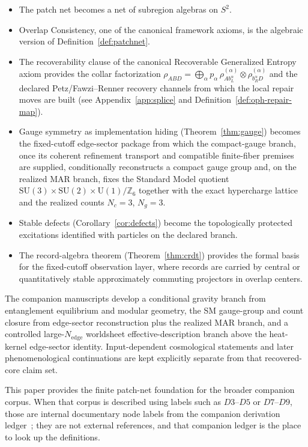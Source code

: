 \documentclass[11pt]{article}
\theoremstyle{remark}
\theoremstyle{plain}
\begin{document}
\begin{itemize}
\item The patch net becomes a net of subregion algebras on $S^2$.
\item Overlap Consistency, one of the canonical framework axioms, is the algebraic version of Definition~\ref{def:patchnet}.
\item The recoverability clause of the canonical Recoverable Generalized Entropy axiom provides the collar factorization $\rho_{ABD} = \bigoplus_\alpha p_\alpha\,\rho^{(\alpha)}_{Ab_L^\alpha}\otimes\rho^{(\alpha)}_{b_R^\alpha D}$ and the declared Petz/Fawzi--Renner recovery channels from which the local repair moves are built (see Appendix~\ref{app:splice} and Definition~\ref{def:oph-repair-map}).
\item Gauge symmetry as implementation hiding (Theorem~\ref{thm:gauge}) becomes the fixed-cutoff edge-sector package from which the compact-gauge branch, once its coherent refinement transport and compatible finite-fiber premises are supplied, conditionally reconstructs a compact gauge group and, on the realized MAR branch, fixes the Standard Model quotient $\mathrm{SU}(3)\times\mathrm{SU}(2)\times\mathrm{U}(1)/\mathbb{Z}_6$ together with the exact hypercharge lattice and the realized counts \(N_c=3\), \(N_g=3\).
\item Stable defects (Corollary~\ref{cor:defects}) become the topologically protected excitations identified with particles on the declared branch.
\item The record-algebra theorem (Theorem~\ref{thm:crdt}) provides the formal basis for the fixed-cutoff observation layer, where records are carried by central or quantitatively stable approximately commuting projectors in overlap centers.
\end{itemize}

The companion manuscripts develop a conditional gravity branch from entanglement equilibrium and modular geometry, the SM gauge-group and count closure from edge-sector reconstruction plus the realized MAR branch, and a controlled large-\(N_{\mathrm{edge}}\) worldsheet effective-description branch above the heat-kernel edge-sector identity. Input-dependent cosmological statements and later phenomenological continuations are kept explicitly separate from that recovered-core claim set.

This paper provides the finite patch-net foundation for the broader companion corpus. When that
corpus is described using labels such as \(D3\)--\(D5\) or \(D7\)--\(D9\), those are internal
documentary node labels from the companion derivation ledger~\cite{OPH}; they are not external
references, and that companion ledger is the place to look up the definitions.
\end{document}

